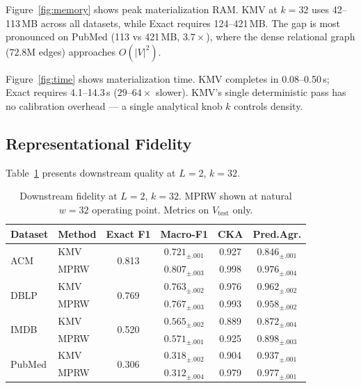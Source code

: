 \documentclass[sigconf]{acmart}
\begin{document}
Figure~\ref{fig:memory} shows peak materialization RAM.
KMV at $k{=}32$ uses 42--113\,MB across all datasets, while Exact requires 124--421\,MB.
The gap is most pronounced on PubMed (113 vs 421\,MB, $3.7\times$), where the dense relational graph ($72.8$M edges) approaches $O(|V|^2)$.

Figure~\ref{fig:time} shows materialization time.
KMV completes in 0.08--0.50\,s; Exact requires 4.1--14.3\,s ($29$--$64\times$ slower).
KMV's single deterministic pass has no calibration overhead --- a single analytical knob $k$ controls density.

\subsection{Representational Fidelity}
\label{sec:fidelity-orig}

Table~\ref{tab:fidelity} presents downstream quality at $L{=}2$, $k{=}32$.

\begin{table}[t]
\caption{Downstream fidelity at $L{=}2$, $k{=}32$. MPRW shown at natural $w{=}32$ operating point. Metrics on $V_\text{test}$ only.}
\label{tab:fidelity}
\centering\small
\begin{tabular}{ll cccc}
\toprule
Dataset & Method & Exact F1 & Macro-F1 & CKA & Pred.Agr. \\
\midrule
\multirow{2}{*}{ACM}
  & KMV  & \multirow{2}{*}{0.813} & $0.721_{\pm.001}$ & 0.927 & $0.846_{\pm.001}$ \\
  & MPRW &                        & $0.807_{\pm.003}$ & 0.998 & $0.976_{\pm.004}$ \\
\midrule
\multirow{2}{*}{DBLP}
  & KMV  & \multirow{2}{*}{0.769} & $0.763_{\pm.002}$ & 0.976 & $0.962_{\pm.002}$ \\
  & MPRW &                        & $0.767_{\pm.003}$ & 0.993 & $0.958_{\pm.002}$ \\
\midrule
\multirow{2}{*}{IMDB}
  & KMV  & \multirow{2}{*}{0.520} & $0.565_{\pm.002}$ & 0.889 & $0.872_{\pm.004}$ \\
  & MPRW &                        & $0.571_{\pm.001}$ & 0.925 & $0.898_{\pm.003}$ \\
\midrule
\multirow{2}{*}{PubMed}
  & KMV  & \multirow{2}{*}{0.306} & $0.318_{\pm.002}$ & 0.904 & $0.937_{\pm.001}$ \\
  & MPRW &                        & $0.312_{\pm.004}$ & 0.979 & $0.977_{\pm.001}$ \\
\bottomrule
\end{tabular}
\end{table}
\end{document}
